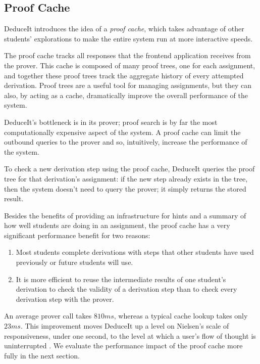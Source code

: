 \documentclass{sigchi}
\begin{document}
\subsection{Proof Cache}

DeduceIt introduces the idea of a \textit{proof cache}, which takes advantage of other students' explorations to make the entire system run at more interactive speeds.

The proof cache tracks all responses that the frontend application receives from the prover. This cache is composed of many proof trees, one for each assignment, and together these proof trees track the aggregate history of every attempted derivation. Proof trees are a useful tool for managing assignments, but they can also, by acting as a cache, dramatically improve the overall performance of the system. 

DeduceIt's bottleneck is in its prover; proof search is by far the most computationally expensive aspect of the system. A proof cache can limit the outbound queries to the prover and so, intuitively, increase the performance of the system. 

To check a new derivation step using the proof cache, DeduceIt queries the proof tree for that derivation's assignment: if the new step already exists in the tree, then the system doesn't need to query the prover; it simply returns the stored result. %

Besides the benefits of providing an infrastructure for hints and a summary of how well students are doing in an assignment, the proof cache has a very significant performance benefit for two reasons:
\begin{enumerate}
  \item Most students complete derivations with steps that other students have used previously or future students will use.
  \item It is more efficient to reuse the intermediate results of one student's derivation to check the validity of a derivation step than to check every derivation step with the prover. \label{hyp:2}
\end{enumerate}  
An average prover call takes $810ms$, whereas a typical cache lookup takes only $23ms$. This improvement moves DeduceIt up a level on Nielsen's scale of responsiveness, under one second, to the level at which a user's flow of thought is uninterrupted \cite{neilsen}. We evaluate the performance impact of the proof cache more fully in the next section.
\end{document}
